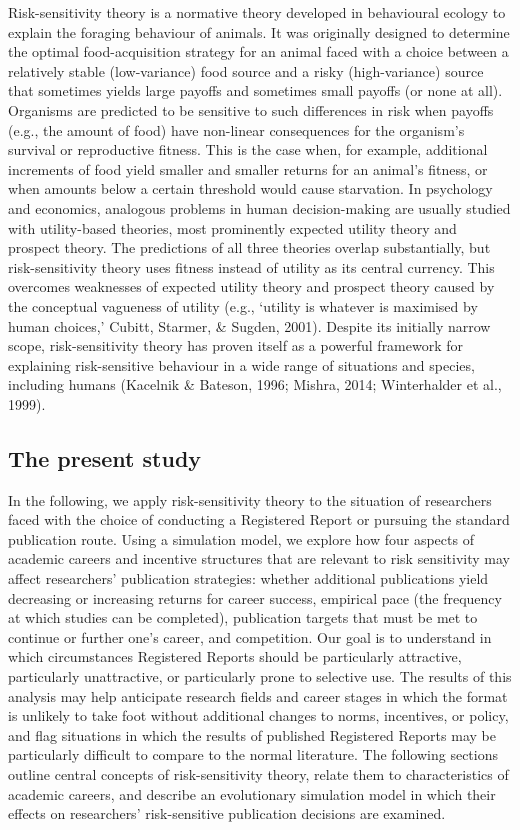 \documentclass[
  ,man,mask,floatsintext]{apa6}
\begin{document}
Risk-sensitivity theory is a normative theory developed in behavioural ecology to explain the foraging behaviour of animals.
It was originally designed to determine the optimal food-acquisition strategy for an animal faced with a choice between a relatively stable (low-variance) food source and a risky (high-variance) source that sometimes yields large payoffs and sometimes small payoffs (or none at all).
Organisms are predicted to be sensitive to such differences in risk when payoffs (e.g., the amount of food) have non-linear consequences for the organism's survival or reproductive fitness.
This is the case when, for example, additional increments of food yield smaller and smaller returns for an animal's fitness, or when amounts below a certain threshold would cause starvation.
In psychology and economics, analogous problems in human decision-making are usually studied with utility-based theories, most prominently expected utility theory and prospect theory.
The predictions of all three theories overlap substantially, but risk-sensitivity theory uses fitness instead of utility as its central currency.
This overcomes weaknesses of expected utility theory and prospect theory caused by the conceptual vagueness of utility (e.g., `utility is whatever is maximised by human choices,' Cubitt, Starmer, \& Sugden, 2001).
Despite its initially narrow scope, risk-sensitivity theory has proven itself as a powerful framework for explaining risk-sensitive behaviour in a wide range of situations and species, including humans (Kacelnik \& Bateson, 1996; Mishra, 2014; Winterhalder et al., 1999).

\hypertarget{the-present-study}{%
\subsection{The present study}\label{the-present-study}}

In the following, we apply
risk-sensitivity theory to
the situation of researchers faced with the choice of conducting a Registered Report or pursuing the standard publication route.
Using a simulation model, we explore how four aspects of academic careers and incentive structures that are relevant to risk sensitivity may affect researchers' publication strategies:
whether additional publications yield decreasing or increasing returns for career success, empirical pace (the frequency at which studies can be completed), publication targets that must be met to continue or further one's career, and competition.
Our goal is to understand in which circumstances Registered Reports should be particularly attractive, particularly unattractive, or particularly prone to selective use.
The results of this analysis may help anticipate research fields and career stages in which the format is unlikely to take foot without additional changes to norms, incentives, or policy, and flag situations in which the results of published Registered Reports may be particularly difficult to compare to the normal literature.
The following sections outline central concepts of risk-sensitivity theory, relate them to characteristics of academic careers, and describe an evolutionary simulation model in which their effects on researchers' risk-sensitive publication decisions are examined.
\end{document}
